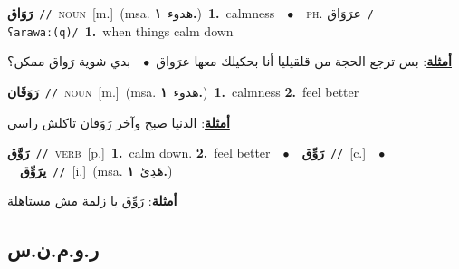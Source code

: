 \documentclass[10pt,a4paper,twoside]{article} %
\begin{document}
\begin{multicols}{2}
{\setlength\topsep{0pt}\textbf{\foreignlanguage{arabic}{رَوَاق}}\ {\color{gray}\texttt{//}\color{black}}\ \textsc{noun}\ [m.]\ \color{gray}(msa. \foreignlanguage{arabic}{هدوء}~\foreignlanguage{arabic}{\textbf{١.}})\color{black}\ \textbf{1.}~calmness\ \ $\bullet$\ \ \textsc{ph.} \color{gray} \foreignlanguage{arabic}{عرَوَاق}\color{black}\ {\color{gray}\texttt{/{\sffamily ʕarawaː(q)}/}\color{black}}\ \textbf{1.}~when things calm down\  \begin{flushright}\color{gray}\foreignlanguage{arabic}{\textbf{\underline{\foreignlanguage{arabic}{أمثلة}}}: بس ترجع الحجة من قلقيليا أنا بحكيلك معها عرَواق\ $\bullet$\ \  بدي شوية رَواق ممكن؟}\end{flushright}\color{black}} \vspace{2mm}

{\setlength\topsep{0pt}\textbf{\foreignlanguage{arabic}{رَوَقَان}}\ {\color{gray}\texttt{//}\color{black}}\ \textsc{noun}\ [m.]\ \color{gray}(msa. \foreignlanguage{arabic}{هدوء}~\foreignlanguage{arabic}{\textbf{١.}})\color{black}\ \textbf{1.}~calmness  \textbf{2.}~feel better\  \begin{flushright}\color{gray}\foreignlanguage{arabic}{\textbf{\underline{\foreignlanguage{arabic}{أمثلة}}}: الدنيا صبح وآخر رَوَقان تاكلش راسي}\end{flushright}\color{black}} \vspace{2mm}

{\setlength\topsep{0pt}\textbf{\foreignlanguage{arabic}{رَوَّق}}\ {\color{gray}\texttt{//}\color{black}}\ \textsc{verb}\ [p.]\ \textbf{1.}~calm down.  \textbf{2.}~feel better\ \ $\bullet$\ \ \setlength\topsep{0pt}\textbf{\foreignlanguage{arabic}{رَوِّق}}\ {\color{gray}\texttt{//}\color{black}}\ [c.]\ \ $\bullet$\ \ \setlength\topsep{0pt}\textbf{\foreignlanguage{arabic}{يرَوِّق}}\ {\color{gray}\texttt{//}\color{black}}\ [i.]\ \color{gray}(msa. \foreignlanguage{arabic}{هَدِئ}~\foreignlanguage{arabic}{\textbf{١.}})\color{black}\  \begin{flushright}\color{gray}\foreignlanguage{arabic}{\textbf{\underline{\foreignlanguage{arabic}{أمثلة}}}: رَوِّق يا زلمة مش مستاهلة}\end{flushright}\color{black}} \vspace{2mm}

\vspace{-3mm}
\subsection*{\color{blue}\foreignlanguage{arabic}{ر.و.م.ن.س}\color{blue}{ (ntws)}} 


\end{multicols}
\end{document}

